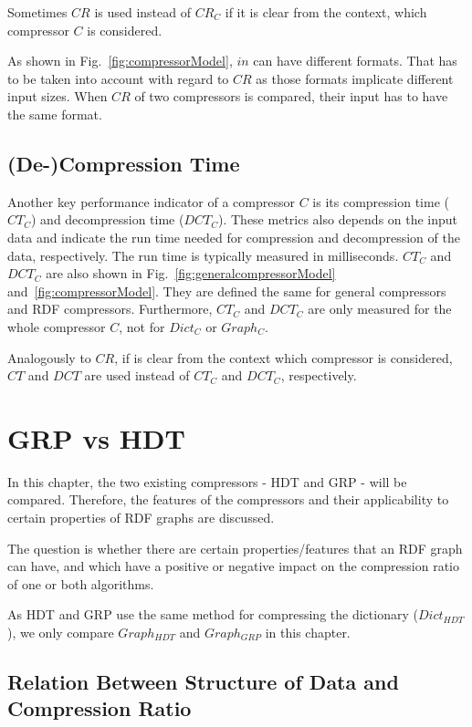 Sometimes $CR$ is used instead of $CR_C$ if it is clear from the context, which compressor $C$ is considered.

As shown in Fig.~\ref{fig:compressorModel}, $in$ can have different formats. That has to be taken into account with regard to $CR$ as those formats implicate different input sizes. When $CR$ of two compressors is compared, their input has to have the same format.

\subsection{(De-)Compression Time}

Another key performance indicator of a compressor $C$ is its compression time ($CT_C$) and decompression time ($DCT_C$). These metrics also depends on the input data and indicate the run time needed for compression and decompression of the data, respectively. The run time is typically measured in milliseconds. $CT_C$ and $DCT_C$ are also shown in Fig.~\ref{fig:generalcompressorModel} and~\ref{fig:compressorModel}. They are defined the same for general compressors and RDF compressors. Furthermore, $CT_C$ and $DCT_C$ are only measured for the whole compressor $C$, not for $Dict_C$ or $Graph_C$.

Analogously to $CR$, if is clear from the context which compressor is considered, $CT$ and $DCT$ are used instead of $CT_C$ and $DCT_C$, respectively.


\section{GRP vs HDT}\label{sec:approachGRPvsHDT}

In this chapter, the two existing compressors - HDT and GRP - will be compared. Therefore, the features of the compressors and their applicability to certain properties of RDF graphs are discussed.

The question is whether there are certain properties/features that an RDF graph can have, and which have a positive or negative impact on the compression ratio of one or both algorithms. 

As HDT and GRP use the same method for compressing the dictionary ($Dict_{HDT}$), we only compare $Graph_{HDT}$ and $Graph_{GRP}$ in this chapter.

\subsection{Relation Between Structure of Data and Compression Ratio}\label{sec:relationDataStructureComprRatio}

